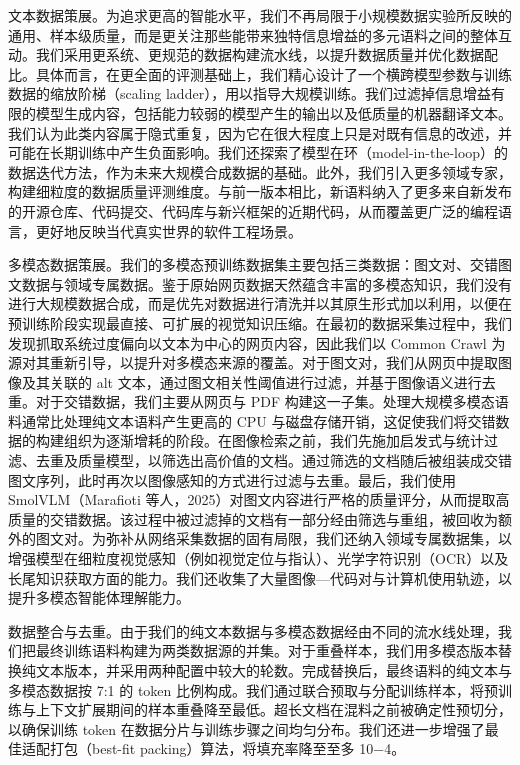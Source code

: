 文本数据策展。为追求更高的智能水平，我们不再局限于小规模数据实验所反映的通用、样本级质量，而是更关注那些能带来独特信息增益的多元语料之间的整体互动。我们采用更系统、更规范的数据构建流水线，以提升数据质量并优化数据配比。具体而言，在更全面的评测基础上，我们精心设计了一个横跨模型参数与训练数据的缩放阶梯（scaling ladder），用以指导大规模训练。我们过滤掉信息增益有限的模型生成内容，包括能力较弱的模型产生的输出以及低质量的机器翻译文本。我们认为此类内容属于隐式重复，因为它在很大程度上只是对既有信息的改述，并可能在长期训练中产生负面影响。我们还探索了模型在环（model-in-the-loop）的数据迭代方法，作为未来大规模合成数据的基础。此外，我们引入更多领域专家，构建细粒度的数据质量评测维度。与前一版本相比，新语料纳入了更多来自新发布的开源仓库、代码提交、代码库与新兴框架的近期代码，从而覆盖更广泛的编程语言，更好地反映当代真实世界的软件工程场景。



多模态数据策展。我们的多模态预训练数据集主要包括三类数据：图文对、交错图文数据与领域专属数据。鉴于原始网页数据天然蕴含丰富的多模态知识，我们没有进行大规模数据合成，而是优先对数据进行清洗并以其原生形式加以利用，以便在预训练阶段实现最直接、可扩展的视觉知识压缩。在最初的数据采集过程中，我们发现抓取系统过度偏向以文本为中心的网页内容，因此我们以 Common Crawl 为源对其重新引导，以提升对多模态来源的覆盖。对于图文对，我们从网页中提取图像及其关联的 alt 文本，通过图文相关性阈值进行过滤，并基于图像语义进行去重。对于交错数据，我们主要从网页与 PDF 构建这一子集。处理大规模多模态语料通常比处理纯文本语料产生更高的 CPU 与磁盘存储开销，这促使我们将交错数据的构建组织为逐渐增耗的阶段。在图像检索之前，我们先施加启发式与统计过滤、去重及质量模型，以筛选出高价值的文档。通过筛选的文档随后被组装成交错图文序列，此时再次以图像感知的方式进行过滤与去重。最后，我们使用 SmolVLM（Marafioti 等人，2025）对图文内容进行严格的质量评分，从而提取高质量的交错数据。该过程中被过滤掉的文档有一部分经由筛选与重组，被回收为额外的图文对。为弥补从网络采集数据的固有局限，我们还纳入领域专属数据集，以增强模型在细粒度视觉感知（例如视觉定位与指认）、光学字符识别（OCR）以及长尾知识获取方面的能力。我们还收集了大量图像—代码对与计算机使用轨迹，以提升多模态智能体理解能力。

数据整合与去重。由于我们的纯文本数据与多模态数据经由不同的流水线处理，我们把最终训练语料构建为两类数据源的并集。对于重叠样本，我们用多模态版本替换纯文本版本，并采用两种配置中较大的轮数。完成替换后，最终语料的纯文本与多模态数据按 7:1 的 token 比例构成。我们通过联合预取与分配训练样本，将预训练与上下文扩展期间的样本重叠降至最低。超长文档在混料之前被确定性预切分，以确保训练 token 在数据分片与训练步骤之间均匀分布。我们还进一步增强了最佳适配打包（best-fit packing）算法，将填充率降至至多 10−4。